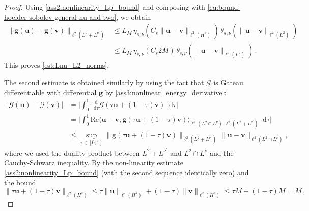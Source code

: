 \documentclass[12pt,a4paper]{amsart}
\numberwithin{equation}{section}
\newcommand{\ulu}{\boldsymbol{u}}
\newcommand{\ulv}{\boldsymbol{v}}
\newcommand{\ulg}{\boldsymbol{g}}
\newcommand*\diff{\mathop{}\!\mathrm{d}}
\newcommand{\twoasts}{{2^*_s}}
\newcommand{\Clip}[1]{L_{#1}}
\newcommand{\thetasnu}{\theta_{s,\nu}}
\begin{document}
	\begin{proof}
		Using \ref{ass2:nonlinearity_Lp_bound} and composing with \eqref{eq:bound-hoelder-sobolev-general-nu-and-two}, we obtain
		\begin{align*}
			\big\| \ulg(\ulu)-\ulg(\ulv) \big\|_{\ell^2(L^2 +L^{\nu^\prime})} 
			&\leq   \Clip{M}\,   \eta_{s,\nu}(C_s \|  \ulu-\ulv \|_{\ell^2(H^{s})}) \, \thetasnu (\|  \ulu-\ulv  \|_{\ell^2(L^2)}) \\
			& \leq \Clip{M}\,\eta_{s,\nu}(C_s 2M) \, \thetasnu (\|  \ulu-\ulv \|_{\ell^2(L^2)}) \,.
		\end{align*}
		This proves \eqref{est:Lnu_L2_norms}.
		
		The second estimate is obtained similarly by using the fact that $\mathscr{G}$ is Gateau differentiable with differential $\ulg $ by \ref{ass3:nonlinear_energy_derivative}:
		\begin{align*}
			\big| \mathscr{G}(\ulu) -\mathscr{G}(\ulv) \big| 
			& =  \Big| \int_{0}^1 \frac{\diff}{\diff \tau}  \mathscr{G}( \tau \ulu + (1-\tau) \ulv) \diff  \tau \Big|  \\
			& = \Big| \int_{0}^1  \mathrm{Re}\langle \ulu -\ulv , \ulg(\tau \ulu + (1-\tau) \ulv ) \rangle_{\ell^2(L^2\cap L^{\nu}) , \ell^2(L^2+L^{\nu^\prime})}\diff  \tau \Big|  \\
			&\leq  \sup_{ \tau \in [0,1]} \| \ulg(\tau \ulu + (1-\tau) \ulv ) \|_{\ell^2(L^2+L^{\nu^\prime})} \, \|\ulu-\ulv \|_{\ell^2(L^2\cap L^{\nu})} ,
		\end{align*}
		where we used the duality product between $L^2+L^{\nu^\prime}$ and $L^2\cap L^{\nu} $ and the Cauchy-Schwarz inequality. By the non-linearity estimate \ref{ass2:nonlinearity_Lp_bound} (with the second sequence identically zero) and the bound
		\[\| \tau \ulu + (1-\tau) \ulv \|_{\ell^2(H^s)} \leq \tau\|  \ulu  \|_{\ell^2(H^s)}+ (1-\tau)\|  \ulv \|_{\ell^2(H^s)}\leq \tau M +  (1-\tau)M = M\,,\]

\end{proof}
\end{document}
